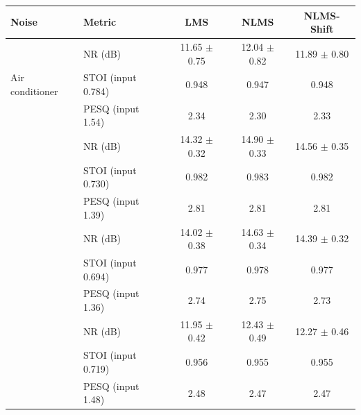 \begin{tabular}{llccc}\toprule
Noise & Metric & LMS & NLMS & NLMS-Shift\\\midrule
\multirow{3}{*}{Air conditioner} & NR (dB) & 11.65 $\pm$ 0.75 & 12.04 $\pm$ 0.82 & 11.89 $\pm$ 0.80\\
 & STOI (input 0.784) & 0.948 & 0.947 & 0.948\\
 & PESQ (input 1.54) & 2.34 & 2.30 & 2.33\\\addlinespace
\multirow{3}{*}{Vacuum cleaner} & NR (dB) & 14.32 $\pm$ 0.32 & 14.90 $\pm$ 0.33 & 14.56 $\pm$ 0.35\\
 & STOI (input 0.730) & 0.982 & 0.983 & 0.982\\
 & PESQ (input 1.39) & 2.81 & 2.81 & 2.81\\\addlinespace
\multirow{3}{*}{Copy machine} & NR (dB) & 14.02 $\pm$ 0.38 & 14.63 $\pm$ 0.34 & 14.39 $\pm$ 0.32\\
 & STOI (input 0.694) & 0.977 & 0.978 & 0.977\\
 & PESQ (input 1.36) & 2.74 & 2.75 & 2.73\\\addlinespace
\multirow{3}{*}{Babble} & NR (dB) & 11.95 $\pm$ 0.42 & 12.43 $\pm$ 0.49 & 12.27 $\pm$ 0.46\\
 & STOI (input 0.719) & 0.956 & 0.955 & 0.955\\
 & PESQ (input 1.48) & 2.48 & 2.47 & 2.47\\
\bottomrule\end{tabular}

